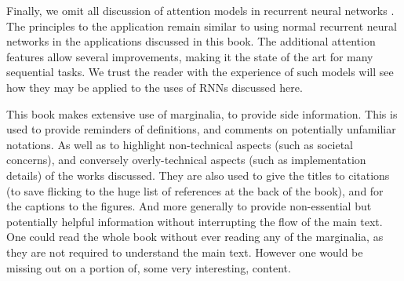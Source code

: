 \documentclass[12pt,parskip]{komatufte}
\begin{document}
Finally, we omit all discussion of attention models in recurrent neural networks .
The principles to the application remain similar to using normal recurrent neural networks in the applications discussed in this book.
The additional attention features allow several improvements, making it the state of the art for many sequential tasks.
We trust the reader with the experience of such models will see how they may be applied to the uses of RNNs discussed here.


This book makes extensive use of marginalia, to provide side information.
This is used to provide reminders of definitions, and comments on potentially unfamiliar notations.
As well as to highlight non-technical aspects (such as societal concerns), and conversely overly-technical aspects (such as implementation details) of the works discussed.
They are also used to give the titles to citations (to save flicking to the huge list of references at the back of the book), and for the captions to the figures.
And more generally to provide non-essential  but potentially helpful information without interrupting the flow of the main text.
One could read the whole book without ever reading any of the marginalia, as they are not required to understand the main text.
However one would be missing out on a portion of, some very interesting, content.

\printbib
\end{document}
